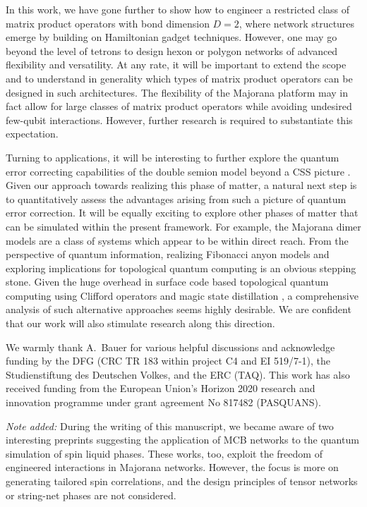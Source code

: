 \documentclass[twocolumn,floats,prx,showpacs]{revtex4-1}
\newcommand{\rein}[1]{{\color{rein} #1}}
\begin{document}
In this work, we have gone further to show how to engineer a restricted class of matrix product operators with bond dimension $D=2$, where network structures emerge by building on Hamiltonian gadget techniques. However, one may go beyond the level of tetrons to design hexon or polygon networks of advanced flexibility and versatility.  At any rate, it will be important to extend the scope and to understand in generality  which types of matrix product operators can be designed in such architectures. The flexibility of the Majorana platform may in fact allow for large classes of matrix product operators while  avoiding undesired few-qubit interactions.  However, further research is required to substantiate this expectation. 

\rein{Turning to applications, it will be interesting to further explore the quantum error correcting capabilities of the double semion model
beyond a CSS picture \cite{SemionErrorCorrection}. Given our approach towards realizing this phase of matter,
a natural next step is to quantitatively assess the advantages arising from such a picture of quantum error correction. 
It will be equally exciting}  to explore other phases of matter that can be simulated within the 
present framework. For example, the Majorana dimer models \cite{PhysRevB.94.115115,PhysRevB.94.115127} are a class of systems which appear to be within direct reach.
From the perspective of quantum information, realizing
Fibonacci anyon models \cite{Levin2005}  and exploring  implications 
for topological quantum computing is an obvious stepping stone. Given the huge overhead in surface code based topological quantum computing using Clifford operators and magic state distillation \cite{PhysRevA.71.022316}, 
a comprehensive analysis of such alternative approaches seems highly desirable. 
We are confident that our work will also stimulate research along this direction.

\begin{acknowledgements}
We warmly thank A.\ Bauer for various helpful discussions and acknowledge funding by the DFG (CRC TR 183 within project C4 and EI 519/7-1),
the Studienstiftung des Deutschen Volkes, and the ERC (TAQ). This work has also received funding from the European Union's Horizon 2020 research and innovation 
programme under grant agreement No 817482 (PASQUANS). 

\emph{Note added:}  During the writing of this manuscript, we became aware of two  interesting preprints
\cite{Sagi2018,Thomson2018}  suggesting the application of  MCB networks  to the quantum simulation 
of spin liquid phases. These works, too, exploit the freedom of  engineered  
interactions in Majorana networks. However, the focus is more on generating tailored spin correlations,  and the design principles of tensor networks  or string-net phases are not considered.  
\end{acknowledgements}
\end{document}
